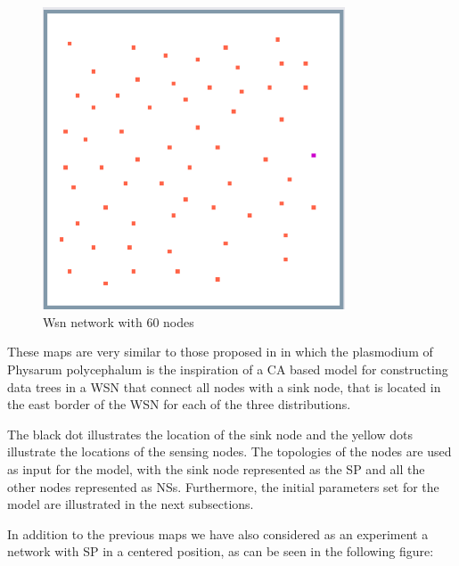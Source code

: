 \begin{figure}
  \centering
    \includegraphics[width=0.8\textwidth]{wsn_60_exp/1_wsn_60}%
    
  \caption{Wsn network with 60 nodes}
  \label{fig:wsn_60_exp/1_wsn_60}
\end{figure}


These maps are very similar to those proposed in \cite{tsompanas2015cellular} in which the plasmodium of Physarum polycephalum is the inspiration of a CA based model for constructing data trees in a WSN that connect all nodes with a sink node, that is located in the east border of the WSN for each of the three distributions.

\par
The black dot illustrates the location of the sink node and the yellow dots illustrate the locations of the sensing nodes. The topologies of the nodes are used as input for the model, with the sink node represented as the SP and all the other nodes represented as NSs. Furthermore, the initial parameters set for the model are illustrated in the next subsections.

\par
In addition to the previous maps we have also considered as an experiment a network with SP in a centered position, as can be seen in the following figure:

